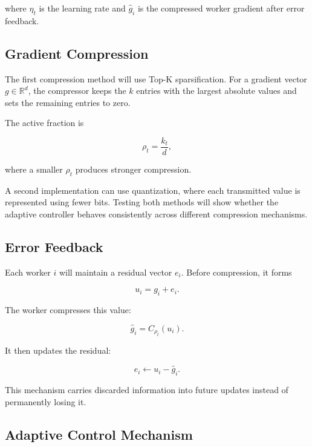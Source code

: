 \documentclass[conference]{IEEEtran}
\begin{document}
where $\eta_t$ is the learning rate and $\hat{g}_i$ is the compressed worker gradient after error feedback.

\subsection{Gradient Compression}

The first compression method will use Top-K sparsification. For a gradient vector $g \in \mathbb{R}^d$, the compressor keeps the $k$ entries with the largest absolute values and sets the remaining entries to zero.

The active fraction is

\begin{equation}
\rho_t = \frac{k_t}{d},
\end{equation}

where a smaller $\rho_t$ produces stronger compression.

A second implementation can use quantization, where each transmitted value is represented using fewer bits. Testing both methods will show whether the adaptive controller behaves consistently across different compression mechanisms.

\subsection{Error Feedback}

Each worker $i$ will maintain a residual vector $e_i$. Before compression, it forms

\begin{equation}
u_i = g_i + e_i.
\end{equation}

The worker compresses this value:

\begin{equation}
\hat{g}_i = C_{\rho_t}(u_i).
\end{equation}

It then updates the residual:

\begin{equation}
e_i \leftarrow u_i - \hat{g}_i.
\end{equation}

This mechanism carries discarded information into future updates instead of permanently losing it.

\subsection{Adaptive Control Mechanism}
\end{document}
